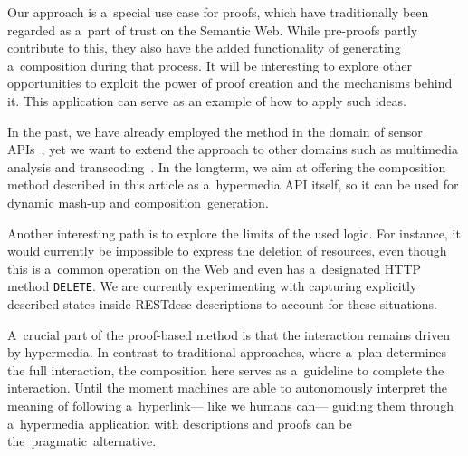 Our approach is a~special use case for proofs,
which have traditionally been regarded as a~part of trust on the Semantic Web.
While pre-proofs partly contribute to this,
they also have the added functionality of generating a~composition during that process.
It will be interesting to explore other opportunities
to exploit the power of proof creation
and the mechanisms behind it.
This application can serve as an example of how to apply such ideas.

In the past, we have already employed the method
in the domain of sensor APIs~\cite{verborgh_ssn_2012},
yet we want to extend the approach to other domains such as multimedia analysis and transcoding~\cite{verborgh_mtap_2013,vanlancker_mtap_2013}.
In the longterm, we aim at offering the composition method described in this article
as a~hypermedia API itself,
so it can be used for dynamic mash-up and composition~generation.

Another interesting path is to explore the limits of the used logic.
For instance, it would currently be impossible to express the deletion of resources,
even though this is a~common operation on the Web
and even has a~designated HTTP method \verb!DELETE!.
We are currently experimenting with capturing explicitly described states
inside RESTdesc descriptions to account for these situations.


A~crucial part of the proof-based method is that the interaction remains driven by hypermedia.
In contrast to traditional approaches,
where a~plan determines the full interaction,
the composition here serves as a~guideline to complete the interaction.
Until the moment machines are able to autonomously interpret
the meaning of following a~hyperlink---%
like we humans can---%
guiding them through a~hypermedia application with descriptions and proofs
can be the~pragmatic~alternative.


